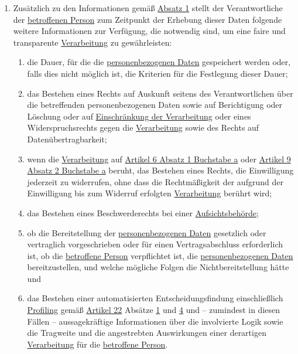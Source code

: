 \begin{enumerate}
\begin{enumerate}
  \end{enumerate}

  \item Zusätzlich zu den Informationen gemäß \hyperref[itm:13-1]{Absatz 1} stellt der Verantwortliche der \hyperref[itm:04-1]{betroffenen
   Person} zum Zeitpunkt der Erhebung dieser Daten folgende weitere Informationen zur Verfügung, die notwendig sind, um
   eine faire und transparente \hyperref[itm:04-2]{Verarbeitung} zu gewährleisten:
  \label{itm:13-2}

  \begin{enumerate}
  
    \item die Dauer, für die die \hyperref[itm:04-1]{personenbezogenen Daten} gespeichert werden oder, falls dies nicht möglich ist, die
     Kriterien für die Festlegung dieser Dauer;
    \label{itm:13-2a}

    \item das Bestehen eines Rechts auf Auskunft seitens des Verantwortlichen über die betreffenden personenbezogenen
     Daten sowie auf Berichtigung oder Löschung oder auf \hyperref[itm:04-3]{Einschränkung der Verarbeitung} oder eines Widerspruchsrechts
     gegen die \hyperref[itm:04-2]{Verarbeitung} sowie des Rechts auf Datenübertragbarkeit;
    \label{itm:13-2b}

    \item wenn die \hyperref[itm:04-2]{Verarbeitung} auf \hyperref[itm:06-1a]{Artikel 6 Absatz 1 Buchstabe a} oder \hyperref[itm:09-2a]
     {Artikel 9 Absatz 2 Buchstabe a} beruht, das Bestehen eines Rechts, die Einwilligung jederzeit zu widerrufen, ohne
     dass die Rechtmäßigkeit der aufgrund der Einwilligung bis zum Widerruf erfolgten \hyperref[itm:04-2]{Verarbeitung} berührt wird;
    \label{itm:13-2c}

    \item das Bestehen eines Beschwerderechts bei einer \hyperref[itm:04-21]{Aufsichtsbehörde};
    \label{itm:13-2d}

    \item ob die Bereitstellung der \hyperref[itm:04-1]{personenbezogenen Daten} gesetzlich oder vertraglich vorgeschrieben oder für einen
     Vertragsabschluss erforderlich ist, ob die \hyperref[itm:04-1]{betroffene Person} verpflichtet ist, die \hyperref[itm:04-1]{personenbezogenen Daten}
     bereitzustellen, und welche mögliche Folgen die Nichtbereitstellung hätte und
    \label{itm:13-2e}

    \item das Bestehen einer automatisierten Entscheidungsfindung einschließlich \hyperref[itm:04-4]{Profiling} gemäß \hyperref[ch:22]
     {Artikel 22} Absätze \hyperref[itm:22-1]{1} und \hyperref[itm:22-4]{4} und -- zumindest in diesen Fällen --
     aussagekräftige Informationen über die involvierte Logik sowie die Tragweite und die angestrebten Auswirkungen
     einer derartigen \hyperref[itm:04-2]{Verarbeitung} für die \hyperref[itm:04-1]{betroffene Person}.
    \label{itm:13-2f}


\end{enumerate}
\end{enumerate}
